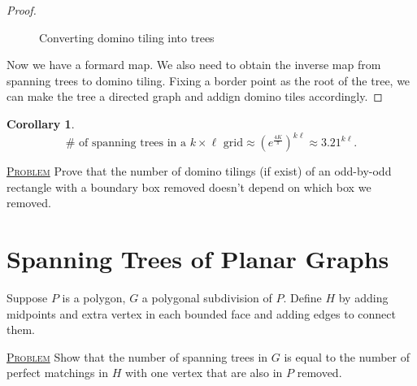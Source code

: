 \documentclass{report}
\newcommand{\fancyem}[1]{\underline{\textsc{#1}}}
\newtheorem{corollary}{Corollary}[section]
\theoremstyle{definition}
\theoremstyle{remark}
\numberwithin{equation}{section}
\begin{document}
\begin{proof}
\begin{figure}[h]
        \caption{Converting domino tiling into trees}
        \label{fig:treetotiling}
    \end{figure}

Now we have a formard map. We also need to obtain the inverse map from spanning trees to domino tiling. Fixing a border point as the root of the tree, we can make the tree a directed graph and addign domino tiles accordingly.
\end{proof}

\begin{corollary}
    \[
        \# \text{ of spanning trees in a $k \times \ell$ grid} \approx \left(e^\frac{4K}{\pi}\right)^{k\ell} \approx 3.21^{k\ell}.
    \]
\end{corollary}

\fancyem{Problem} Prove that the number of domino tilings (if exist) of an odd-by-odd rectangle with a boundary box removed doesn't depend on which box we removed.

\section{Spanning Trees of Planar Graphs}
Suppose $P$ is a polygon, $G$ a polygonal subdivision of $P$. Define $H$ by adding midpoints and extra vertex in each bounded face and adding edges to connect them.

\fancyem{Problem} Show that the number of spanning trees in $G$ is equal to the number of perfect matchings in $H$ with one vertex that are also in $P$ removed.
\end{document}
